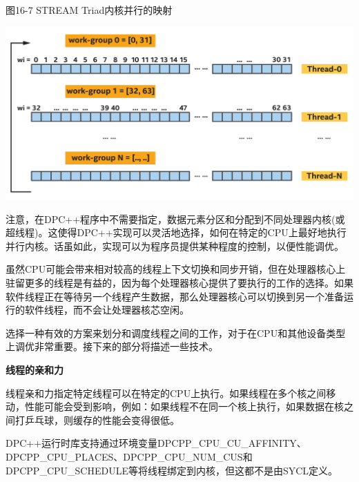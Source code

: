 \hspace*{\fill} \par %
图16-7 STREAM Triad内核并行的映射
\begin{center}
	\includegraphics[width=1.0\textwidth]{content/chapter-16/images/5}
\end{center}

注意，在DPC++程序中不需要指定，数据元素分区和分配到不同处理器内核(或超线程)。这使得DPC++实现可以灵活地选择，如何在特定的CPU上最好地执行并行内核。话虽如此，实现可以为程序员提供某种程度的控制，以便性能调优。\par

虽然CPU可能会带来相对较高的线程上下文切换和同步开销，但在处理器核心上驻留更多的线程是有益的，因为每个处理器核心提供了要执行的工作的选择。如果软件线程正在等待另一个线程产生数据，那么处理器核心可以切换到另一个准备运行的软件线程，而不会让处理器核芯空闲。\par

\begin{tcolorbox}[colback=blue!5!white,colframe=blue!75!black, title=选择如何绑定和调度线程]
选择一种有效的方案来划分和调度线程之间的工作，对于在CPU和其他设备类型上调优非常重要。接下来的部分将描述一些技术。
\end{tcolorbox}

\hspace*{\fill} \par %
\textbf{线程的亲和力}

线程亲和力指定特定线程可以在特定的CPU上执行。如果线程在多个核之间移动，性能可能会受到影响，例如：如果线程不在同一个核上执行，如果数据在核之间打乒乓球，则缓存的性能会变得很低。\par

DPC++运行时库支持通过环境变量DPCPP\_CPU\_CU\_AFFINITY、DPCPP\_CPU\_PLACES、DPCPP\_CPU\_NUM\_CUS和DPCPP\_CPU\_SCHEDULE等将线程绑定到内核，但这都不是由SYCL定义。\par

